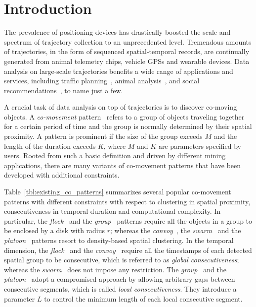 
\section{Introduction}
The prevalence of positioning devices has drastically boosted 
the scale and spectrum of trajectory collection to an unprecedented level. 
Tremendous amounts of trajectories, in the form of sequenced spatial-temporal 
records, are continually generated from animal telemetry chips, 
vehicle GPSs and wearable devices. Data analysis on large-scale 
trajectories benefits a wide range of applications and services, 
including traffic planning~\cite{zheng2011urban}, animal analysis~\cite{li2010miningperiodic}, and social recommendations~\cite{bao2013survey}, to name just a few.

A crucial task of data analysis on top of trajectories is 
to discover co-moving objects. A \emph{co-movement} pattern~\cite{li2013managing,zheng2015survey} 
refers to a group of objects traveling together for a certain period of time 
and the group is normally determined by their spatial proximity. 
A pattern is prominent if the size of the group exceeds $M$ and the length of the duration exceeds $K$, where $M$ and $K$ are parameters specified by users. Rooted from such a basic definition 
and driven by different mining applications, there are many variants 
of co-movement patterns that have been developed with additional constraints.

Table~\ref{tbl:existing_co_patterns} summarizes several popular co-movement patterns 
with different constraints with respect to clustering in spatial proximity,
consecutiveness in temporal duration and computational complexity. 
In particular,  the \emph{flock}~\cite{gudmundsson2006flock} 
and the \emph{group}~\cite{wang2006grouppattern} patterns require 
all the objects in a group to be enclosed by a disk with radius $r$; 
whereas the \emph{convoy}~\cite{jeung2008convoy}, the \emph{swarm}~\cite{li2010swarm} 
and the \emph{platoon}~\cite{li2015platoon} patterns resort to density-based 
spatial clustering. 
In the temporal dimension, the \emph{flock}~\cite{gudmundsson2006flock} 
and the \emph{convoy}~\cite{jeung2008convoy} require all the timestamps 
of each detected spatial group to be consecutive, which is referred to as \emph{global consecutiveness}; 
whereas the \emph{swarm}~\cite{li2010swarm} does not impose any restriction. 
The \emph{group}~\cite{wang2006grouppattern} and the \emph{platoon}~\cite{li2015platoon} adopt a compromised approach by allowing
arbitrary gaps between consecutive segments, which is called \emph{local consecutiveness}. 
They introduce a parameter $L$ to control the minimum length of each local consecutive segment.

